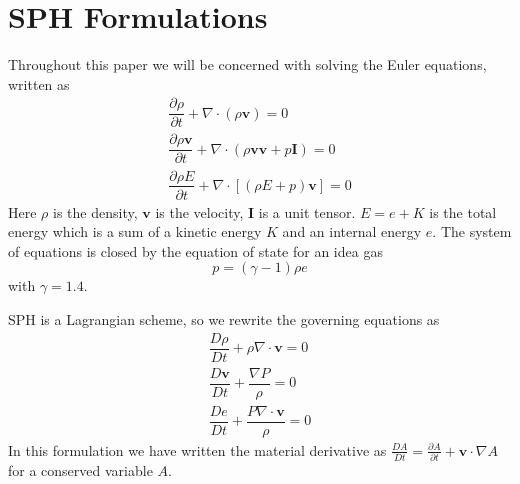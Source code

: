\documentclass[review]{elsarticle}
\begin{document}
\section{SPH Formulations} \label{sph}
Throughout this paper we will be concerned with solving the Euler equations, written as
\begin{align}
\dfrac{\partial \rho}{\partial t} + \nabla \cdot \left(\rho \textbf{v} \right) = 0 \label{eq:gov-cs-rho} \\
\dfrac{\partial \rho \textbf{v}}{\partial t} + \nabla \cdot \left(\rho \textbf{v} \textbf{v} + p\textbf{I}\right) = 0 \label{eq:gov-cs-v} \\
\dfrac{\partial \rho E}{\partial t} + \nabla \cdot \left[\left(\rho E + p \right)\textbf{v}\right] = 0 \label{eq:gov-cs-e}
\end{align}
Here $\rho$ is the density, $\textbf{v}$ is the velocity, $\textbf{I}$ is a unit tensor.
$E = e + K $ is the total energy which is a sum of a kinetic energy $K$ and an internal energy $e$.
The system of equations is closed by the equation of state for an idea gas
\begin{equation}
p = \left(\gamma - 1\right)\rho e \label{eq:EOS}
\end{equation}
with $\gamma=1.4$.

SPH is a Lagrangian scheme, so we rewrite the governing equations as
\begin{align}   %
\dfrac{D \rho}{D t} + \rho \nabla \cdot \textbf{v} = 0 \label{eq:gov-nc-rho}\\
\dfrac{D \textbf{v}}{D t} + \dfrac{\nabla P}{\rho} =0 \label{eq:gov-nc-v}\\
\dfrac{D e}{D t} + \dfrac{P \nabla \cdot \textbf{v}}{\rho} = 0 \label{eq:gov-nc-e}
\end{align}
In this formulation we have written the material derivative as 
$\frac{D A}{Dt} = \frac{\partial A}{\partial t} + \textbf{v} \cdot \nabla A$ for a conserved variable $A$.
\end{document}
